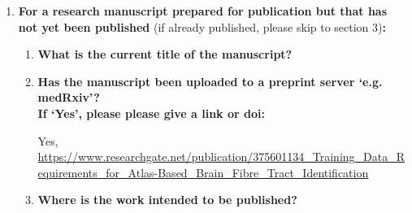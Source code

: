 {\begin{enumerate}[leftmargin=*,label={\bfseries\arabic*.}]
\begin{enumerate}[label={\alph*)}]
	\item \textbf{Please include a link to or doi for the work:}

	\item \textbf{Where was the work published?}

	\item \textbf{Who published the work?}

	\item \textbf{When was the work published?}

	\item \textbf{List the manuscript's authors in the order they appear on the publication:}

	\item \textbf{Was the work peer reviewd?}

	\item \textbf{Have you retained the copyright?}

	\item \textbf{Was an earlier form of the manuscript uploaded to a preprint server (e.g. medRxiv)? If ‘Yes’, please give a link or doi}
	\\
	If ‘No’, please seek permission from the relevant publisher and check the box next to the below statement:
\begin{itemize}\itemsep0em
\item[$\Box$] {\itshape I acknowledge permission of the publisher named under 1d to include in this thesis portions of the publication named as included in 1c.}
\end{itemize}
%
\end{enumerate}
%
\item \textbf{For a research manuscript prepared for publication but that has not yet been published} (if already published, please skip to section 3)\textbf{:}
%
\begin{enumerate}[label={\alph*)}]\itemsep0em
	\item \textbf{What is the current title of the manuscript?}

	\item \textbf{Has the manuscript been uploaded to a preprint server `e.g. medRxiv'?
	\\
	If `Yes', please please give a link or doi:}

	Yes, \url{https://www.researchgate.net/publication/375601134_Training_Data_Requirements_for_Atlas-Based_Brain_Fibre_Tract_Identification}
	\item \textbf{Where is the work intended to be published?}


\end{enumerate}
\end{enumerate}}

